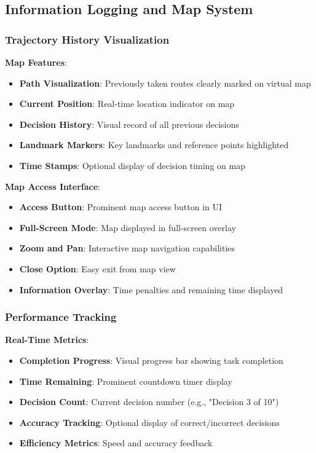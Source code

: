 \documentclass[12pt]{article}
\begin{document}
\subsection{Information Logging and Map System}

\subsubsection{Trajectory History Visualization}

\textbf{Map Features}:
\begin{itemize}
    \item \textbf{Path Visualization}: Previously taken routes clearly marked on virtual map
    \item \textbf{Current Position}: Real-time location indicator on map
    \item \textbf{Decision History}: Visual record of all previous decisions
    \item \textbf{Landmark Markers}: Key landmarks and reference points highlighted
    \item \textbf{Time Stamps}: Optional display of decision timing on map
\end{itemize}

\textbf{Map Access Interface}:
\begin{itemize}
    \item \textbf{Access Button}: Prominent map access button in UI
    \item \textbf{Full-Screen Mode}: Map displayed in full-screen overlay
    \item \textbf{Zoom and Pan}: Interactive map navigation capabilities
    \item \textbf{Close Option}: Easy exit from map view
    \item \textbf{Information Overlay}: Time penalties and remaining time displayed
\end{itemize}

\subsubsection{Performance Tracking}

\textbf{Real-Time Metrics}:
\begin{itemize}
    \item \textbf{Completion Progress}: Visual progress bar showing task completion
    \item \textbf{Time Remaining}: Prominent countdown timer display
    \item \textbf{Decision Count}: Current decision number (e.g., "Decision 3 of 10")
    \item \textbf{Accuracy Tracking}: Optional display of correct/incorrect decisions
    \item \textbf{Efficiency Metrics}: Speed and accuracy feedback
\end{itemize}
\end{document}
